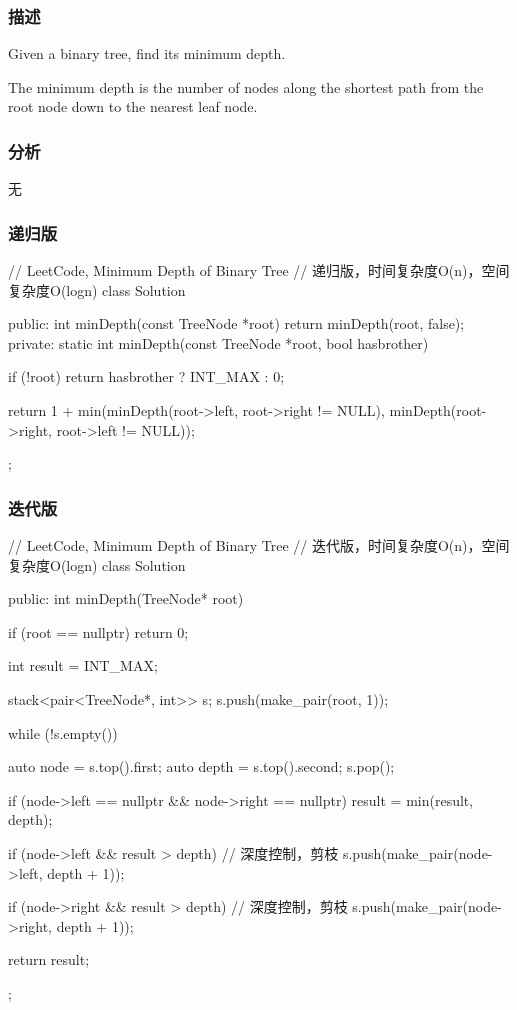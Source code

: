 \subsubsection{描述}
Given a binary tree, find its minimum depth.

The minimum depth is the number of nodes along the shortest path from the root node down to the nearest leaf node.


\subsubsection{分析}
无


\subsubsection{递归版}
\begin{Code}
// LeetCode, Minimum Depth of Binary Tree
// 递归版，时间复杂度O(n)，空间复杂度O(logn)
class Solution {
public:
    int minDepth(const TreeNode *root) {
        return minDepth(root, false);
    }
private:
    static int minDepth(const TreeNode *root, bool hasbrother) {
        if (!root) return hasbrother ? INT_MAX : 0;

        return 1 + min(minDepth(root->left, root->right != NULL),
                minDepth(root->right, root->left != NULL));
    }
};
\end{Code}


\subsubsection{迭代版}
\begin{Code}
// LeetCode, Minimum Depth of Binary Tree
// 迭代版，时间复杂度O(n)，空间复杂度O(logn)
class Solution {
public:
    int minDepth(TreeNode* root) {
        if (root == nullptr)
            return 0;

        int result = INT_MAX;

        stack<pair<TreeNode*, int>> s;
        s.push(make_pair(root, 1));

        while (!s.empty()) {
            auto node = s.top().first;
            auto depth = s.top().second;
            s.pop();

            if (node->left == nullptr && node->right == nullptr)
                result = min(result, depth);

            if (node->left && result > depth) // 深度控制，剪枝
                s.push(make_pair(node->left, depth + 1));

            if (node->right && result > depth) // 深度控制，剪枝
                s.push(make_pair(node->right, depth + 1));
        }

        return result;
    }
};
\end{Code}

